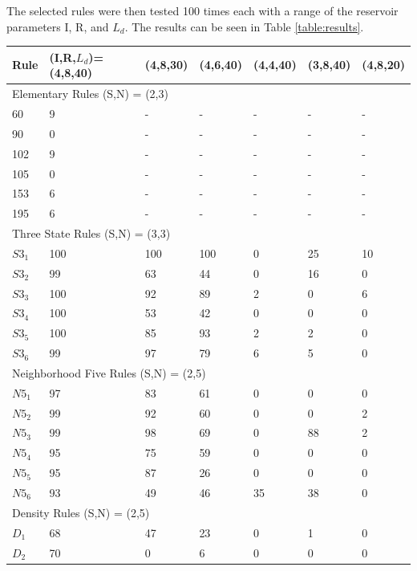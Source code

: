 \documentclass{article}
\begin{document}
\begin{multicols}{2}
The selected rules were then tested 100 times each with a range of the 
reservoir parameters I, R, and $L_{d}$.  The results can be seen in Table 
\ref{table:results}. 

\begin{table}[!htb] \centering
\small
\begin{tabular}{|l|l|l|l|l|l|l|}
\hline
Rule & (I,R,$L_{d}$)=(4,8,40) & (4,8,30) & (4,6,40) & (4,4,40) & (3,8,40) & 
(4,8,20) \\ \hline
\multicolumn{7}{|l|}{Elementary Rules (S,N) = (2,3)} \\ \hline
60 & 9 & - & - & - & - & - \\ \hline
90 & 0 & - & - & - & - & - \\ \hline
102 & 9 & - & - & - & - & - \\ \hline
105 & 0 & - & - & - & - & - \\ \hline
153 & 6 & - & - & - & - & - \\ \hline
195 & 6 & - & - & - & - & - \\ \hline
\multicolumn{7}{|l|}{Three State Rules (S,N) = (3,3)} \\ \hline
$S3_{1}$ & 100 & 100 & 100 & 0 & 25 & 10 \\ \hline
$S3_{2}$ & 99 & 63 & 44 & 0 & 16 & 0 \\ \hline
$S3_{3}$ & 100 & 92 & 89 & 2 & 0 & 6 \\ \hline
$S3_{4}$ & 100 & 53 & 42 & 0 & 0 & 0 \\ \hline
$S3_{5}$ & 100 & 85 & 93 & 2 & 2 & 0 \\ \hline
$S3_{6}$ & 99 & 97 & 79 & 6 & 5 & 0 \\ \hline
\multicolumn{7}{|l|}{Neighborhood Five Rules (S,N) = (2,5)} \\ \hline
$N5_{1}$ & 97 & 83 & 61 & 0 & 0 & 0 \\ \hline
$N5_{2}$ & 99 & 92 & 60 & 0 & 0 & 2 \\ \hline
$N5_{3}$ & 99 & 98 & 69 & 0 & 88 & 2  \\ \hline
$N5_{4}$ & 95 & 75 & 59 & 0 & 0 & 0 \\ \hline
$N5_{5}$ & 95 & 87 & 26 & 0 & 0 & 0 \\ \hline
$N5_{6}$ & 93 & 49 & 46 & 35 & 38 & 0  \\ \hline
\multicolumn{7}{|l|}{Density Rules (S,N) = (2,5)} \\ \hline
$D_{1}$ & 68 & 47 & 23 & 0 & 1 & 0  \\ \hline
$D_{2}$ & 70 & 0 & 6 & 0 & 0 & 0 \\ \hline

\end{tabular}
\end{table}
\end{multicols}
\end{document}
